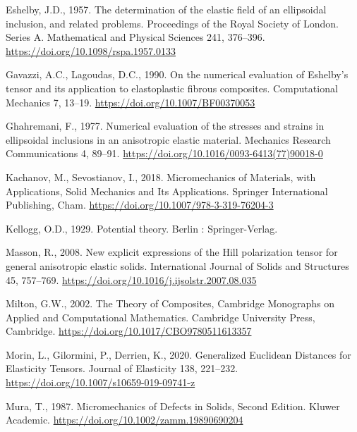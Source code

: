 \documentclass[
  letterpaper,
  DIV=11,
  numbers=noendperiod]{scrreprt}
\newlength{\cslhangindent}
\newlength{\cslentryspacingunit} %
\newenvironment{CSLReferences}[2] %
 {%
  \setlength{\parindent}{0pt}
  \ifodd #1
  \let\oldpar\par
  \def\par{\hangindent=\cslhangindent\oldpar}
  \fi
  \setlength{\parskip}{#2\cslentryspacingunit}
 }%
 {}
\begin{document}
\begin{CSLReferences}{1}{0}
\leavevmode{}%
Eshelby, J.D., 1957. The determination of the elastic field of an
ellipsoidal inclusion, and related problems. Proceedings of the Royal
Society of London. Series A. Mathematical and Physical Sciences 241,
376--396. \url{https://doi.org/10.1098/rspa.1957.0133}

\leavevmode{}%
Gavazzi, A.C., Lagoudas, D.C., 1990. On the numerical evaluation of
{Eshelby}'s tensor and its application to elastoplastic fibrous
composites. Computational Mechanics 7, 13--19.
\url{https://doi.org/10.1007/BF00370053}

\leavevmode{}%
Ghahremani, F., 1977. Numerical evaluation of the stresses and strains
in ellipsoidal inclusions in an anisotropic elastic material. Mechanics
Research Communications 4, 89--91.
\url{https://doi.org/10.1016/0093-6413(77)90018-0}

\leavevmode{}%
Kachanov, M., Sevostianov, I., 2018. Micromechanics of {Materials}, with
{Applications}, Solid {Mechanics} and {Its Applications}. {Springer
International Publishing}, {Cham}.
\url{https://doi.org/10.1007/978-3-319-76204-3}

\leavevmode{}%
Kellogg, O.D., 1929. Potential theory. {Berlin : Springer-Verlag}.

\leavevmode{}%
Masson, R., 2008. New explicit expressions of the {Hill} polarization
tensor for general anisotropic elastic solids. International Journal of
Solids and Structures 45, 757--769.
\url{https://doi.org/10.1016/j.ijsolstr.2007.08.035}

\leavevmode{}%
Milton, G.W., 2002. The {Theory} of {Composites}, Cambridge {Monographs}
on {Applied} and {Computational Mathematics}. {Cambridge University
Press}, {Cambridge}. \url{https://doi.org/10.1017/CBO9780511613357}

\leavevmode{}%
Morin, L., Gilormini, P., Derrien, K., 2020. Generalized {Euclidean
Distances} for {Elasticity Tensors}. Journal of Elasticity 138,
221--232. \url{https://doi.org/10.1007/s10659-019-09741-z}

\leavevmode{}%
Mura, T., 1987. Micromechanics of {Defects} in {Solids}, {Second
Edition}. {Kluwer Academic}.
\url{https://doi.org/10.1002/zamm.19890690204}


\end{CSLReferences}
\end{document}
